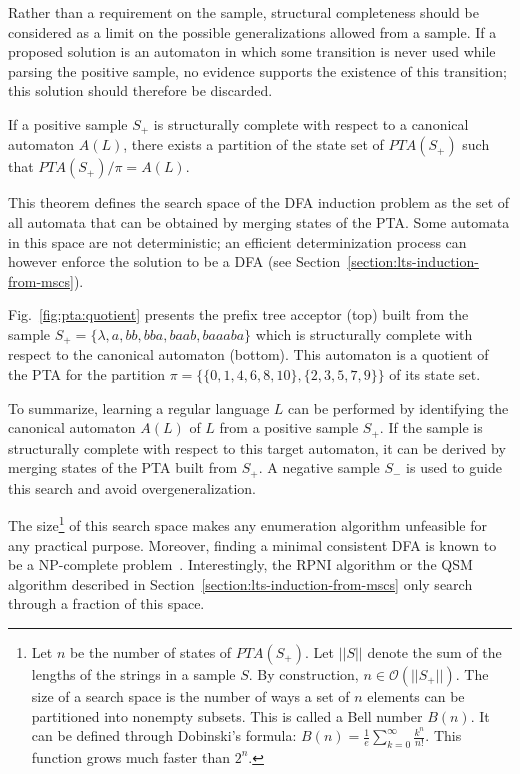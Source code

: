 Rather than a requirement on the sample, structural completeness should be considered as a limit on the possible generalizations allowed from a sample. If a proposed solution is an automaton in which some transition is never used while parsing the positive sample, no evidence supports the existence of this transition; this solution should therefore be discarded. 

\begin{theorem}
\label{search:theo}
If a positive sample $S_+$ is structurally complete with respect to a canonical automaton $A(L)$, there exists a partition of the state set of $PTA(S_+)$ such that $PTA(S_+)/\pi = A(L)$.
\end{theorem} 

This theorem defines the search space of the DFA induction problem as the set of all automata that can be obtained by merging states of the PTA. Some automata in this space are not deterministic; an efficient determinization process can however enforce the solution to be a DFA (see Section~\ref{section:lts-induction-from-mscs}).

Fig.~\ref{fig:pta:quotient} presents the prefix tree acceptor (top) built from the sample 
$S_+ = \{\lambda,a,bb,bba,baab,baaaba\}$ which is structurally complete with respect to the canonical automaton (bottom).
This automaton is a quotient of the PTA for the partition $\pi=\{\{0,1,4,6,8,10\},\{2,3,5,7,9\}\}$ of its state set.

To summarize, learning a regular language $L$ can be performed by identifying the canonical automaton $A(L)$ of $L$ from a positive sample $S_+$. If the sample is structurally complete with respect to this target automaton, it can be derived by merging states of the PTA built from $S_+$. A negative sample $S_-$ is used to guide this search and avoid overgeneralization. 

The size\footnote{Let $n$ be the number of states of $PTA(S_+)$. Let $||S||$ denote the sum of the lengths of the strings in a sample $S$. By construction, $n \in \mathcal{O}(||S_+||)$. The size of a search space is the number of ways a set of $n$ elements can be partitioned into nonempty subsets. This is called a Bell number $B(n)$. It can be defined through Dobinski's formula: $B(n) = \frac{1}{e} \sum_{k=0}^{\infty} \frac{k^n}{n!}$. This function grows much faster than $2^n$.} of this search space makes any enumeration algorithm unfeasible for any practical purpose. Moreover, finding a minimal consistent DFA is known to be a NP-complete problem~\cite{Gold:1978,Angluin:1978}. Interestingly, the RPNI algorithm or the \textsc{QSM} algorithm described in Section~\ref{section:lts-induction-from-mscs} only search through a fraction of this space.

